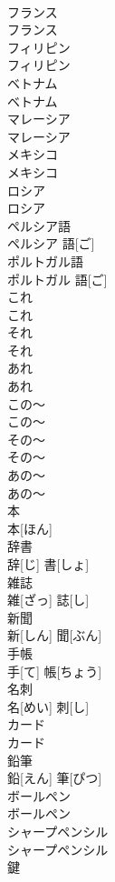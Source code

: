 \documentclass[8pt]{extreport}
\begin{document}
\begin{CJK}{UTF8}{min}
\\	フランス	
\\	フランス		
\\	フィリピン	
\\	フィリピン		
\\	ベトナム	
\\	ベトナム		
\\	マレーシア	
\\	マレーシア		
\\	メキシコ	
\\	メキシコ		
\\	ロシア	
\\	ロシア		
\\	ペルシア語	
\\	ペルシア 語[ご]		
\\	ポルトガル語	
\\	ポルトガル 語[ご]		
\\	これ	
\\	これ		
\\	それ	
\\	それ		
\\	あれ	
\\	あれ		
\\	この～	
\\	この～		
\\	その～	
\\	その～		
\\	あの～	
\\	あの～		
\\	本	
\\	本[ほん]		
\\	辞書	
\\	辞[じ] 書[しょ]		
\\	雑誌	
\\	雑[ざっ] 誌[し]		
\\	新聞	
\\	新[しん] 聞[ぶん]		
\\	手帳	
\\	手[て] 帳[ちょう]		
\\	名刺	
\\	名[めい] 刺[し]		
\\	カード	
\\	カード		
\\	鉛筆	
\\	鉛[えん] 筆[ぴつ]		
\\	ボールペン	
\\	ボールペン		
\\	シャープペンシル	
\\	シャープペンシル		
\\	鍵	

\end{CJK}
\end{document}
